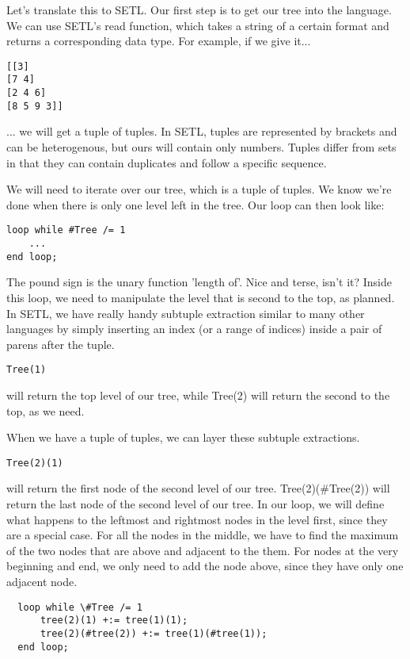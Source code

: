 \documentclass[11pt]{article}
\begin{document}
Let's translate this to SETL. Our first step is to get our tree into 
the language. We can use SETL's read function, which takes a string of a certain
format and returns a corresponding data type. For example, if we give it...

\begin{verbatim}
[[3]
[7 4]
[2 4 6]
[8 5 9 3]]
\end{verbatim}

... we will get a tuple of tuples. In SETL, tuples are represented by brackets and
can be heterogenous, but ours will contain only numbers. Tuples differ
from sets in that they can contain duplicates and follow a specific sequence.

We will need to iterate over our tree, which is a tuple of tuples. We
know we're done when there is only one level left in the tree. Our
loop can then look like:

\begin{verbatim}
loop while #Tree /= 1
    ...
end loop;
\end{verbatim}

The pound sign is the unary function 'length of'. Nice and terse, isn't it?
Inside this loop, we need to manipulate the level that is second to the top, as
planned. In SETL, we have really handy subtuple extraction similar to many other
languages by simply inserting an index (or a range of indices) inside a pair of
parens after the tuple. \begin{verbatim}Tree(1)\end{verbatim} will return the
top level of our tree, while Tree(2) will return the second to the top, as we
need.

When we have a tuple of tuples, we can layer these subtuple extractions.
\begin{verbatim}Tree(2)(1)\end{verbatim} will return the first node of the
second level of our tree. Tree(2)(\#Tree(2)) will return the last node of the
second level of our tree. In our loop, we will define what happens to the
leftmost and rightmost nodes in the level first, since they are a special
case. For all the nodes in the middle, we have to find the maximum of the two
nodes that are above and adjacent to the them. For nodes at the very beginning
and end, we only need to add the node above, since they have only one adjacent
node.

\begin{verbatim}
  loop while \#Tree /= 1
      tree(2)(1) +:= tree(1)(1);
      tree(2)(#tree(2)) +:= tree(1)(#tree(1));
  end loop;  
\end{verbatim}
\end{document}
